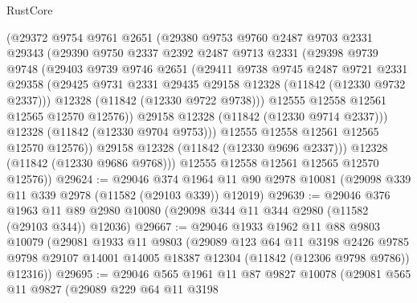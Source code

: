 \begin{lexlean}{RustCore}
\begin{coremodule}
              (@29372
                @9754
                @9761
                @2651
                (@29380
                  @9753
                  @9760
                  @2487
                  @9703
                  @2331
                  @29343
                  (@29390
                    @9750
                    @2337
                    @2392
                    @2487
                    @9713
                    @2331
                    (@29398
                      @9739
                      @9748
                      (@29403
                        @9739
                        @9746
                        @2651
                        (@29411
                          @9738
                          @9745
                          @2487
                          @9721
                          @2331
                          @29358
                          (@29425 @9731 @2331 @29435 @29158 @12328 (@11842 (@12330 @9732 @2337)))
                          @12328
                          (@11842 (@12330 @9722 @9738)))
                        @12555
                        @12558
                        @12561
                        @12565
                        @12570
                        @12576))
                    @29158
                    @12328
                    (@11842 (@12330 @9714 @2337)))
                  @12328
                  (@11842 (@12330 @9704 @9753)))
                @12555
                @12558
                @12561
                @12565
                @12570
                @12576))
            @29158
            @12328
            (@11842 (@12330 @9696 @2337)))
          @12328
          (@11842 (@12330 @9686 @9768)))
        @12555
        @12558
        @12561
        @12565
        @12570
        @12576))
@29624 := @29046
    @374
    @1964
    @11
    @90
    @2978
    @10081
    (@29098 @339 @11 @339 @2978 (@11582 (@29103 @339)) @12019)
@29639 := @29046
    @376
    @1963
    @11
    @89
    @2980
    @10080
    (@29098 @344 @11 @344 @2980 (@11582 (@29103 @344)) @12036)
@29667 := @29046
    @1933
    @1962
    @11
    @88
    @9803
    @10079
    (@29081
      @1933
      @11
      @9803
      (@29089
        @123
        @64
        @11
        @3198
        @2426
        @9785
        @9798
        @29107
        @14001
        @14005
        @18387
        @12304
        (@11842 (@12306 @9798 @9786))
        @12316))
@29695 := @29046
    @565
    @1961
    @11
    @87
    @9827
    @10078
    (@29081
      @565
      @11
      @9827
      (@29089
        @229
        @64
        @11
        @3198

\end{coremodule}
\end{lexlean}
